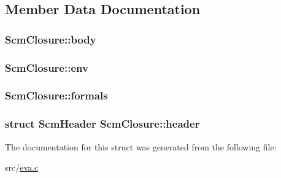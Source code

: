 \subsection{Member Data Documentation}
\hypertarget{struct_scm_closure_a6d3f56515432cb5237491324860a2f81}{
\subsubsection[{body}]{ Scm\-Closure\-::body}}\label{struct_scm_closure_a6d3f56515432cb5237491324860a2f81}
\hypertarget{struct_scm_closure_adf8e8c293b4c14ff06ea886f8d910e00}{
\subsubsection[{env}]{ Scm\-Closure\-::env}}\label{struct_scm_closure_adf8e8c293b4c14ff06ea886f8d910e00}
\hypertarget{struct_scm_closure_a45bf58a061c3073254ce46be81d76c71}{
\subsubsection[{formals}]{ Scm\-Closure\-::formals}}\label{struct_scm_closure_a45bf58a061c3073254ce46be81d76c71}
\hypertarget{struct_scm_closure_a05fbc3affee4ed8375c0310437d23b47}{
\subsubsection[{header}]{\setlength{\rightskip}{0pt plus 5cm}struct {\bf Scm\-Header} Scm\-Closure\-::header}}\label{struct_scm_closure_a05fbc3affee4ed8375c0310437d23b47}


The documentation for this struct was generated from the following file\-:\begin{DoxyCompactItemize}
\item 
src/\hyperlink{eva_8c}{eva.\-c}\end{DoxyCompactItemize}

